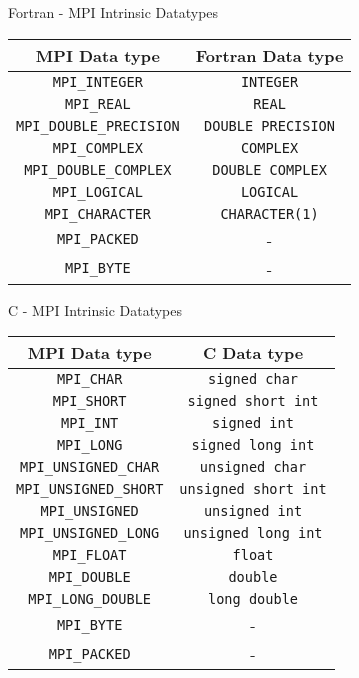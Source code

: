 \documentclass[aspectratio=43]{beamer}
\begin{document}
\begin{frame}[fragile]{Fortran - MPI Intrinsic Datatypes}
\begin{center}
\begin{tabular}{|c||c|}
    \hline
    \color{cscsblue}\textbf{MPI Data type} & \color{cscsbrown}\textbf{Fortran Data type} \\\hline\hline
    \verb+MPI_INTEGER+ & \verb+INTEGER+ \\\hline
    \verb+MPI_REAL+ & \verb+REAL+ \\\hline
    \verb+MPI_DOUBLE_PRECISION+ & \verb+DOUBLE PRECISION+ \\\hline
    \verb+MPI_COMPLEX+ & \verb+COMPLEX+ \\\hline
    \verb+MPI_DOUBLE_COMPLEX+ & \verb+DOUBLE COMPLEX+\\\hline
    \verb+MPI_LOGICAL+ & \verb+LOGICAL+ \\\hline
    \verb+MPI_CHARACTER+ & \verb+CHARACTER(1)+ \\\hline
    \verb+MPI_PACKED+ & -\\\hline
    \verb+MPI_BYTE+ & -\\\hline
\end{tabular}
\end{center}
\end{frame}

\begin{frame}[fragile]{C - MPI Intrinsic Datatypes}
\begin{center}
\begin{tabular}{|c||c|}
    \hline
    \color{cscsblue}\textbf{MPI Data type} & \color{cscsbrown}\textbf{C Data type} \\\hline\hline
    \verb+MPI_CHAR+ & \verb+signed char+\\\hline
    \verb+MPI_SHORT+ & \verb+signed short int+\\\hline
    \verb+MPI_INT+ & \verb+signed int+\\\hline
    \verb+MPI_LONG+ & \verb+signed long int+\\\hline
    \verb+MPI_UNSIGNED_CHAR+ & \verb+unsigned char+\\\hline
    \verb+MPI_UNSIGNED_SHORT+ & \verb+unsigned short int+\\\hline
    \verb+MPI_UNSIGNED+ & \verb+unsigned int+\\\hline
    \verb+MPI_UNSIGNED_LONG+ & \verb+unsigned long int+\\\hline
    \verb+MPI_FLOAT+ & \verb+float+\\\hline
    \verb+MPI_DOUBLE+ & \verb+double+\\\hline
    \verb+MPI_LONG_DOUBLE+ & \verb+long double+\\\hline
    \verb+MPI_BYTE+ & -\\\hline
    \verb+MPI_PACKED+ & -\\\hline
\end{tabular}
\end{center}
\end{frame}
\end{document}
